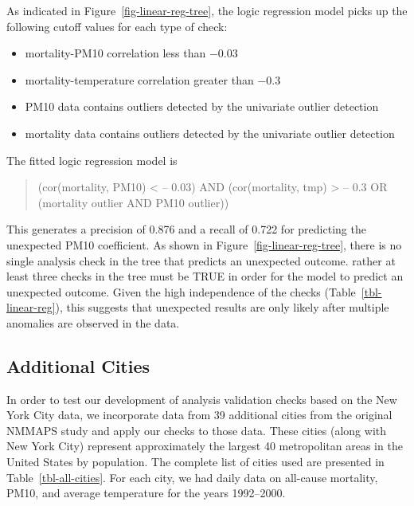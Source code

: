 \documentclass[
  12pt,
]{interact}
\providecommand{\tightlist}{%
  \setlength{\itemsep}{0pt}\setlength{\parskip}{0pt}}
\begin{document}
As indicated in Figure~\ref{fig-linear-reg-tree}, the logic regression
model picks up the following cutoff values for each type of check:

\begin{itemize}
\tightlist
\item
  mortality-PM10 correlation less than \(-0.03\)
\item
  mortality-temperature correlation greater than \(-0.3\)
\item
  PM10 data contains outliers detected by the univariate outlier
  detection
\item
  mortality data contains outliers detected by the univariate outlier
  detection
\end{itemize}

The fitted logic regression model is

\begin{quote}
(cor(mortality, PM10) \textless{} -- 0.03) AND (cor(mortality, tmp)
\textgreater{} -- 0.3 OR (mortality outlier AND PM10 outlier))
\end{quote}

This generates a precision of 0.876 and a recall of 0.722 for predicting
the unexpected PM10 coefficient. As shown in
Figure~\ref{fig-linear-reg-tree}, there is no single analysis check in
the tree that predicts an unexpected outcome. rather at least three
checks in the tree must be TRUE in order for the model to predict an
unexpected outcome. Given the high independence of the checks
(Table~\ref{tbl-linear-reg}), this suggests that unexpected results are
only likely after multiple anomalies are observed in the data.

\subsection{Additional Cities}\label{additional-cities}

In order to test our development of analysis validation checks based on
the New York City data, we incorporate data from 39 additional cities
from the original NMMAPS study and apply our checks to those data. These
cities (along with New York City) represent approximately the largest 40
metropolitan areas in the United States by population. The complete list
of cities used are presented in Table~\ref{tbl-all-cities}. For each
city, we had daily data on all-cause mortality, PM10, and average
temperature for the years 1992--2000.
\end{document}
